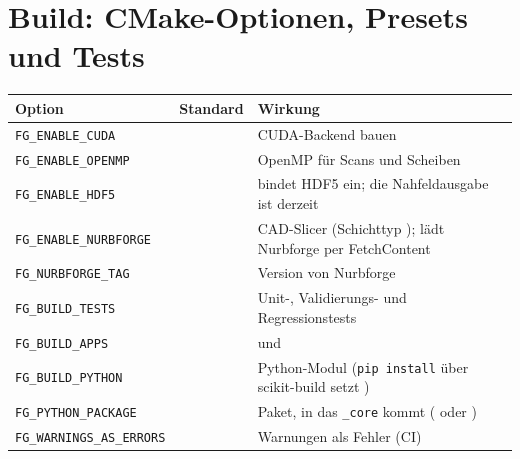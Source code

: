 \section{Build: CMake-Optionen, Presets und Tests}\label{sec:ref-cmake}
\begin{center}
\small
\begin{tabularx}{\linewidth}{>{\raggedright\arraybackslash}p{5.0cm}lY}
\toprule
Option & Standard & Wirkung \\
\midrule
\texttt{FG\_ENABLE\_CUDA} &  & CUDA-Backend bauen \\
\texttt{FG\_ENABLE\_OPENMP} &  & OpenMP für Scans und
Scheiben \\
\texttt{FG\_ENABLE\_HDF5} &  & bindet HDF5 ein; die
Nahfeldausgabe ist derzeit  \\
\texttt{FG\_ENABLE\_NURBFORGE} &  & CAD-Slicer
(Schichttyp ); lädt Nurbforge per FetchContent \\
\texttt{FG\_NURBFORGE\_TAG} &  & Version von
Nurbforge \\
\texttt{FG\_BUILD\_TESTS} &  & Unit-, Validierungs- und
Regressionstests \\
\texttt{FG\_BUILD\_APPS} &  &  und  \\
\texttt{FG\_BUILD\_PYTHON} &  & Python-Modul
(\texttt{pip install} über scikit-build setzt ) \\
\texttt{FG\_PYTHON\_PACKAGE} &  & Paket, in
das \texttt{\_core} kommt ( oder ) \\
\texttt{FG\_WARNINGS\_AS\_ERRORS} &  &
Warnungen als Fehler (CI) \\
\bottomrule
\end{tabularx}
\end{center}

